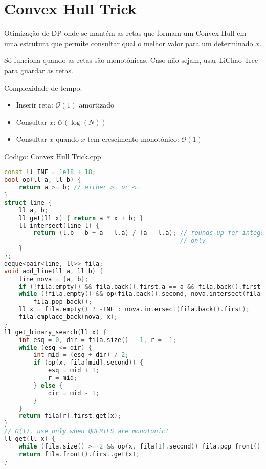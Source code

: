 \documentclass[10pt, a4paper, oneside]{book}
\begin{document}
\section{Convex Hull Trick}


Otimização de DP onde se mantém as retas que formam um Convex Hull em uma estrutura que permite consultar qual o melhor valor para um determinado \(x\).



Só funciona quando as retas são monotônicas. Caso não sejam, usar LiChao Tree para guardar as retas.



Complexidade de tempo:



\begin{itemize}
\item Inserir reta: $\mathcal{O}(1)$ amortizado
\item Consultar \(x\): $\mathcal{O}(\log(N))$
\item Consultar \(x\) quando \(x\) tem crescimento monotônico: $\mathcal{O}(1)$
\end{itemize}

\hfill

Codigo: Convex Hull Trick.cpp

\begin{lstlisting}[language=C++]
const ll INF = 1e18 + 18;
bool op(ll a, ll b) {
    return a >= b; // either >= or <=
}
struct line {
    ll a, b;
    ll get(ll x) { return a * x + b; }
    ll intersect(line l) {
        return (l.b - b + a - l.a) / (a - l.a); // rounds up for integer
                                                // only
    }
};
deque<pair<line, ll>> fila;
void add_line(ll a, ll b) {
    line nova = {a, b};
    if (!fila.empty() && fila.back().first.a == a && fila.back().first.b == b) return;
    while (!fila.empty() && op(fila.back().second, nova.intersect(fila.back().first)))
        fila.pop_back();
    ll x = fila.empty() ? -INF : nova.intersect(fila.back().first);
    fila.emplace_back(nova, x);
}
ll get_binary_search(ll x) {
    int esq = 0, dir = fila.size() - 1, r = -1;
    while (esq <= dir) {
        int mid = (esq + dir) / 2;
        if (op(x, fila[mid].second)) {
            esq = mid + 1;
            r = mid;
        } else {
            dir = mid - 1;
        }
    }
    return fila[r].first.get(x);
}
// O(1), use only when QUERIES are monotonic!
ll get(ll x) {
    while (fila.size() >= 2 && op(x, fila[1].second)) fila.pop_front();
    return fila.front().first.get(x);
}
\end{lstlisting}
\hfill
\end{document}
